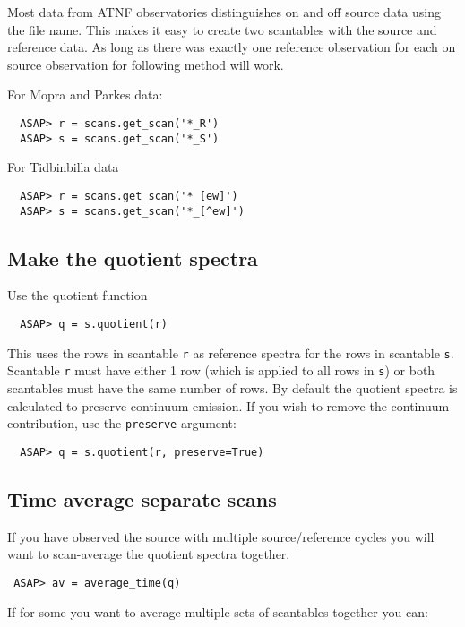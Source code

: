 \documentclass[11pt]{article}
\newcommand{\cmd}[1]{{\tt #1}}
\begin{document}
Most data from ATNF observatories distinguishes on and off source data
using the file name. This makes it easy to create two scantables with
the source and reference data. As long as there was exactly one
reference observation for each on source observation for following
method will work.

For Mopra and Parkes data:
\begin{verbatim}
  ASAP> r = scans.get_scan('*_R')
  ASAP> s = scans.get_scan('*_S')
\end{verbatim}

For Tidbinbilla data
\begin{verbatim}
  ASAP> r = scans.get_scan('*_[ew]')
  ASAP> s = scans.get_scan('*_[^ew]')
\end{verbatim}

\subsection{Make the quotient spectra}

Use the quotient function

\begin{verbatim}
  ASAP> q = s.quotient(r)
\end{verbatim}

This uses the rows in scantable \cmd{r} as reference spectra for the
rows in scantable \cmd{s}. Scantable \cmd{r} must have either 1 row
(which is applied to all rows in \cmd{s}) or both scantables must have
the same number of rows. By default the quotient spectra is calculated
to preserve continuum emission. If you wish to remove the continuum
contribution, use the \cmd{preserve} argument:

\begin{verbatim}
  ASAP> q = s.quotient(r, preserve=True)
\end{verbatim}

\subsection{Time average separate scans}

If you have observed the source with multiple source/reference cycles you
will want to scan-average the quotient spectra together.

\begin{verbatim}
 ASAP> av = average_time(q)
\end{verbatim}

If for some you want to average multiple sets of scantables together
you can:
\end{document}
